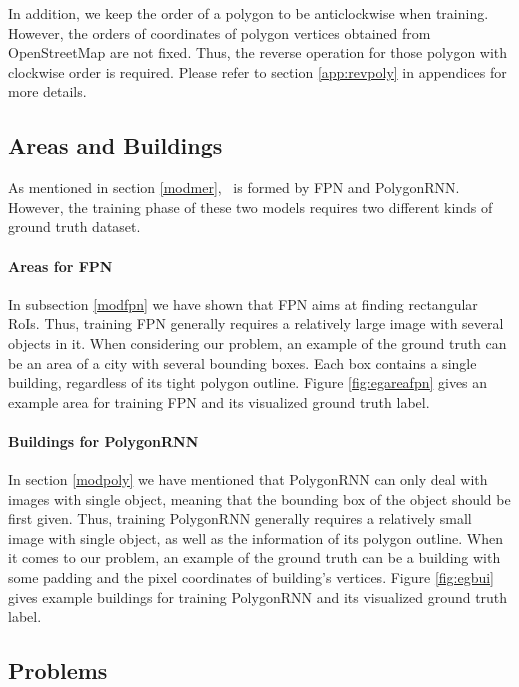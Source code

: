 In addition, we keep the order of a polygon to be anticlockwise when training. However, the orders of coordinates of polygon vertices obtained from OpenStreetMap are not fixed. Thus, the reverse operation for those polygon with clockwise order is required. Please refer to section \ref{app:revpoly} in appendices for more details.

\subsection{Areas and Buildings}\label{arebui}

As mentioned in section \ref{modmer}, \modelnameshort\ is formed by FPN and PolygonRNN. However, the training phase of these two models requires two different kinds of ground truth dataset.

\paragraph{Areas for FPN}
In subsection \ref{modfpn} we have shown that FPN aims at finding rectangular RoIs. Thus, training FPN generally requires a relatively large image with several objects in it. When considering our problem, an example of the ground truth can be an area of a city with several bounding boxes. Each box contains a single building, regardless of its tight polygon outline. Figure \ref{fig:egareafpn} gives an example area for training FPN and its visualized ground truth label.



\paragraph{Buildings for PolygonRNN}
In section \ref{modpoly} we have mentioned that PolygonRNN can only deal with images with single object, meaning that the bounding box of the object should be first given. Thus, training PolygonRNN generally requires a relatively small image with single object, as well as the information of its polygon outline. When it comes to our problem, an example of the ground truth can be a building with some padding and the pixel coordinates of building's vertices. Figure \ref{fig:egbui} gives example buildings for training PolygonRNN and its visualized ground truth label.



\subsection{Problems}\label{proble}

